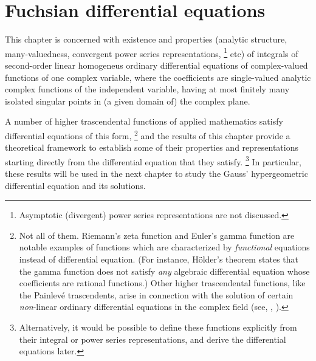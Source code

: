 \chapter{Fuchsian differential equations}
\label{chap:fuchs}


This chapter is concerned with existence and properties (analytic structure, many-valuedness,
convergent power series representations,%
\footnote{Asymptotic (divergent) power series
   representations are not discussed.}
etc) of integrals of second-order linear homogeneus ordinary differential equations of complex-valued functions of one complex variable, 
where the coefficients
are single-valued analytic complex functions of the independent variable, having
at most finitely many isolated singular points in (a given domain of) the
complex plane.







A number of
   higher trascendental functions of applied
mathematics satisfy differential equations of this form,%
\footnote{Not all of them. Riemann's zeta function and Euler's gamma function are notable examples of
   functions which are characterized by \emph{functional} equations
   instead of differential equation. (For instance, H\"older's theorem states that
   the gamma function does not satisfy \emph{any} algebraic differential equation
   whose coefficients are rational functions.) Other higher trascendental
   functions, like the Painlev\'e trascendents, arise in connection with the
   solution of certain \emph{non}-linear ordinary differential equations in the
   complex field (see, \eg, \textcite{Ince:1956}).}
   and the results of this chapter
provide a theoretical framework to establish some of their
properties and representations starting directly from the differential equation that they satisfy.%
\footnote{Alternatively, it would be possible to define these functions explicitly from
   their integral or power series representations, 
   and derive the differential
   equations later.} In particular, these results will be used 
in the next chapter to study the Gauss' hypergeometric
differential equation and its solutions.

